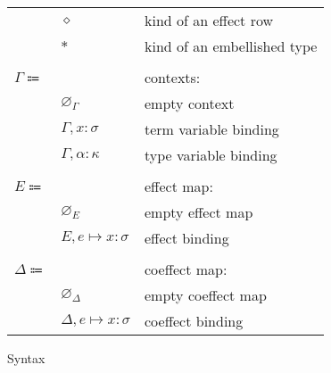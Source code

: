 \documentclass[12pt]{article}
\newcommand\anno[2]{#1 : #2}
\newcommand\evar{x}
\newcommand\embellished{\sigma}
\newcommand\tvar{\alpha}
\newcommand\kind{\kappa}
\newcommand\krow{\diamond}
\newcommand\ktembellished{\ast}
\newcommand\context{\Gamma}
\newcommand\cempty{\varnothing_{\context}}
\newcommand\cextend[2]{#1, #2}
\newcommand\effect{e}
\newcommand\effectmap{E}
\newcommand\coeffectmap{\Delta}
\newcommand\emempty{\varnothing_{\effectmap}}
\newcommand\ecomempty{\varnothing_{\coeffectmap}}
\newcommand\emmap[2]{#1 \mapsto #2}
\newcommand\emextend[2]{#1, #2}
\begin{document}
\begin{figure}
\begin{mdframed}[backgroundcolor=none]
\begin{center}
\begin{tabular}{l l l}
          & $\krow$ & kind of an effect row \\
          & $\ktembellished$ & kind of an embellished type \\
          \\
          $\context \Coloneqq$ & & contexts: \\
          & $\cempty$ & empty context \\
          & $\cextend{\context}{\anno{\evar}{\embellished}}$ & term variable binding \\
          & $\cextend{\context}{\anno{\tvar}{\kind}}$ & type variable binding \\
          \\
          $\effectmap \Coloneqq$ & & effect map: \\
          & $\emempty$ & empty effect map \\
          & $\emextend{\effectmap}{\emmap{\effect}{\anno{\evar}{\embellished}}}$ & effect binding \\
          \\
          $\coeffectmap \Coloneqq$ & & coeffect map: \\
          & $\ecomempty$ & empty coeffect map \\
          & $\emextend{\coeffectmap}{\emmap{\effect}{\anno{\evar}{\embellished}}}$ & coeffect binding \\
        \end{tabular}
      \end{center}

      \caption{Syntax}\label{fig:syntax}
    \end{mdframed}
  \end{figure}
\end{document}
